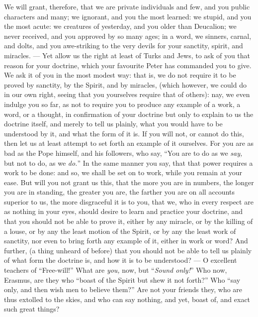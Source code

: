 We will grant, therefore, that we are private individuals and few, and you public characters and many; we ignorant, and you the most learned: we stupid, and you the most acute: we creatures of yesterday, and you older than Deucalion; we never received, and you approved by so many ages; in a word, we sinners, carnal, and dolts, and you awe-striking to the very devils for your sanctity, spirit, and miracles. — Yet allow us the right at least of Turks and Jews, to ask of you that reason for your doctrine, which your favourite Peter has commanded you to give. We ask it of you in the most modest way: that is, we do not require it to be proved by sanctity, by the Spirit, and by miracles, (which however, we could do in our own right, seeing that you yourselves require that of others): nay, we even indulge you so far, as not to require you to produce any example of a work, a word, or a thought, in confirmation of your doctrine but only to explain to us the doctrine itself, and merely to tell us plainly, what you would have to be understood by it, and what the form of it is. If you will not, or cannot do this, then let us at least attempt to set forth an example of it ourselves. For you are as bad as the Pope himself, and his followers, who say, “You are to do as we \emph{say, }but not to do, as we \emph{do.}” In the same manner you say, that that power requires a work to be done: and so, we shall be set on to work, while you remain at your ease. But will you not grant us this, that the more you are in numbers, the longer you are in standing, the greater you are, the farther you are on all accounts superior to us, the more disgraceful it is to you, that we, who in every respect are as nothing in your eyes, should desire to learn and practice your doctrine, and that you should not be able to prove it, either by any miracle, or by the killing of a louse, or by any the least motion of the Spirit, or by any the least work of sanctity, nor even to bring forth any example of it, either in work or word? And further, (a thing unheard of before) that you should not be able to tell us plainly of what form the doctrine is, and how it is to be understood? — O excellent teachers of “Free-will!” What are \emph{you, }now, but “\emph{Sound only!}” Who now, Erasmus, are they who “boast of the Spirit but shew it not forth?” Who “say only, and then wish men to believe them?” Are not your friends they, who are thus extolled to the skies, and who can say nothing, and yet, boast of, and exact such great things?

